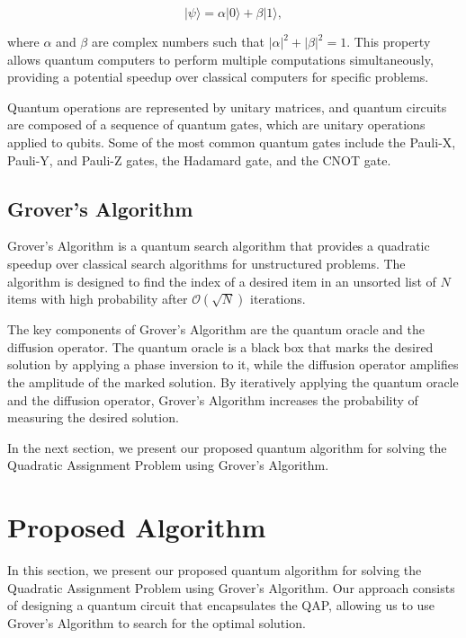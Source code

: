 \begin{equation}
    |\psi\rangle = \alpha |0\rangle + \beta |1\rangle,
\end{equation}

\noindent where $\alpha$ and $\beta$ are complex numbers such that $|\alpha|^2 + |\beta|^2 = 1$. This property allows quantum computers to perform multiple computations simultaneously, providing a potential speedup over classical computers for specific problems.

Quantum operations are represented by unitary matrices, and quantum circuits are composed of a sequence of quantum gates, which are unitary operations applied to qubits. Some of the most common quantum gates include the Pauli-X, Pauli-Y, and Pauli-Z gates, the Hadamard gate, and the CNOT gate.

\subsection{Grover's Algorithm}

Grover's Algorithm \cite{grover1996fast} is a quantum search algorithm that provides a quadratic speedup over classical search algorithms for unstructured problems. The algorithm is designed to find the index of a desired item in an unsorted list of $N$ items with high probability after $\mathcal{O}(\sqrt{N})$ iterations.

The key components of Grover's Algorithm are the quantum oracle and the diffusion operator. The quantum oracle is a black box that marks the desired solution by applying a phase inversion to it, while the diffusion operator amplifies the amplitude of the marked solution. By iteratively applying the quantum oracle and the diffusion operator, Grover's Algorithm increases the probability of measuring the desired solution.

In the next section, we present our proposed quantum algorithm for solving the Quadratic Assignment Problem using Grover's Algorithm.

\section{Proposed Algorithm}\label{sec:algorithm}

In this section, we present our proposed quantum algorithm for solving the Quadratic Assignment Problem using Grover's Algorithm. Our approach consists of designing a quantum circuit that encapsulates the QAP, allowing us to use Grover's Algorithm to search for the optimal solution.

